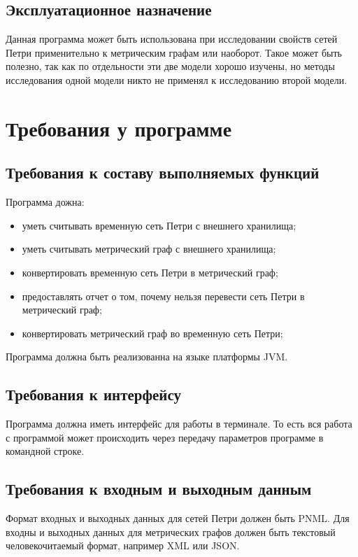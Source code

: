 \documentclass{../TechDoc}
\begin{document}
	\subsection{Эксплуатационное назначение}
	Данная программа может быть использована при исследовании свойств сетей Петри применительно к метрическим графам или наоборот. Такое может быть полезно, так как по отдельности эти две модели хорошо изучены, но методы исследования одной модели никто не применял к исследованию второй модели.
	
	\section{Требования у программе}
	\subsection{Требования к составу выполняемых функций}
	Программа дожна:
	\begin{itemize}
		\item уметь считывать временную сеть Петри с внешнего хранилища;
		\item уметь считывать метрический граф с внешнего хранилища;
		\item конвертировать временную сеть Петри в метрический граф;
		\item предоставлять отчет о том, почему нельзя перевести сеть Петри в метрический граф;
		\item конвертировать метрический граф во временную сеть Петри;
	\end{itemize}

	Программа должна быть реализованна на языке платформы JVM.
	
	\subsection{Требования к интерфейсу}
	Программа должна иметь интерфейс для работы в терминале. То есть вся работа с программой может происходить через передачу параметров программе в командной строке.
	
	\subsection{Требования к входным и выходным данным}
	Формат входных и выходных данных для сетей Петри должен быть PNML\cite{PNML}. Для входны и выходных данных для метрических графов должен быть текстовый человекочитаемый формат, например XML\cite{XML} или JSON\cite{JSON}.
	
\end{document}
